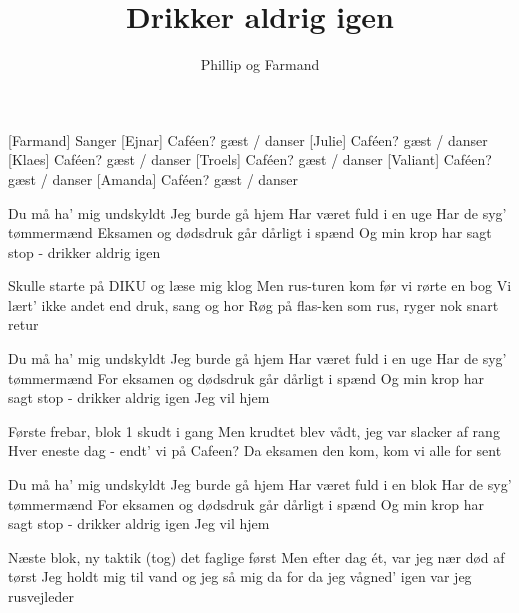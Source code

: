 \documentclass[a4paper,11pt]{article}
\title{Drikker aldrig igen}
\author{Phillip og Farmand}
\begin{document}
\maketitle

\begin{roles}
[Farmand] Sanger
[Ejnar] Caféen? gæst / danser
[Julie] Caféen? gæst / danser
[Klaes] Caféen? gæst / danser
[Troels] Caféen? gæst / danser
[Valiant] Caféen? gæst / danser
[Amanda] Caféen? gæst / danser
\end{roles}

\begin{props}
\end{props}

\begin{song}

Du må ha' mig undskyldt
Jeg burde gå hjem
Har været fuld i en uge
Har de syg' tømmermænd
Eksamen og dødsdruk
går dårligt i spænd
Og min krop har sagt stop
- drikker aldrig igen

Skulle starte på DIKU og læse mig klog
Men rus-turen kom før vi rørte en bog
Vi lært' ikke andet end druk, sang og hor
Røg på flas-ken som rus, ryger nok snart retur

Du må ha' mig undskyldt
Jeg burde gå hjem
Har været fuld i en uge
Har de syg' tømmermænd
For eksamen og dødsdruk
går dårligt i spænd
Og min krop har sagt stop
- drikker aldrig igen
Jeg vil hjem


Første frebar, blok 1 skudt i gang
Men krudtet blev vådt, jeg var slacker af rang
Hver eneste dag - endt' vi på Cafeen?
Da eksamen den kom, kom vi alle for sent

Du må ha' mig undskyldt
Jeg burde gå hjem
Har været fuld i en blok
Har de syg' tømmermænd
For eksamen og dødsdruk
går dårligt i spænd
Og min krop har sagt stop
- drikker aldrig igen
Jeg vil hjem


Næste blok, ny taktik (tog) det faglige først
Men efter dag ét, var jeg nær død af tørst
Jeg holdt mig til vand og jeg så mig da for
da jeg vågned'  igen var jeg rusvejleder


\end{song}
\end{document}

